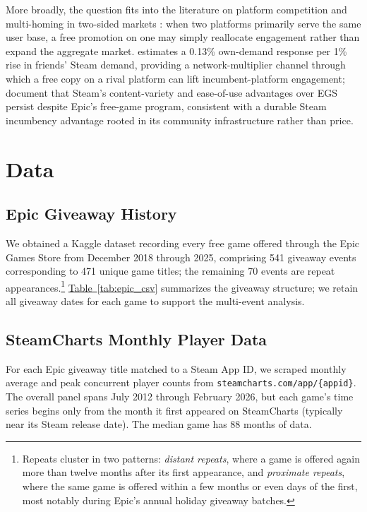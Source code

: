 \documentclass[11pt]{article}
\newcommand{\tabref}[1]{\hyperref[#1]{Table~\ref*{#1}}}
\begin{document}
More broadly, the question fits
into the literature on platform competition and multi-homing in two-sided markets
\citep{rochet2003}: when two platforms primarily serve the same user base, a free
promotion on one may simply reallocate engagement rather than expand the aggregate
market. \citet{tudon2022} estimates a 0.13\% own-demand response per 1\% rise in
friends' Steam demand, providing a network-multiplier channel through which a free
copy on a rival platform can lift incumbent-platform engagement; \citet{nabil2025}
document that Steam's content-variety and ease-of-use advantages over EGS persist
despite Epic's free-game program, consistent with a durable Steam incumbency
advantage rooted in its community infrastructure rather than price.

\section{Data}
\label{sec:data}

\subsection{Epic Giveaway History}

We obtained a Kaggle dataset \citep{dongre2025} recording every free game offered through
the Epic Games Store from December 2018 through 2025, comprising 541 giveaway events
corresponding to 471 unique game titles; the remaining 70 events are repeat
appearances.\footnote{Repeats cluster in two patterns: \textit{distant repeats},
where a game is offered again more than twelve months after its first
appearance, and \textit{proximate repeats}, where the same game is offered
within a few months or even days of the first, most notably during Epic's
annual holiday giveaway batches.} \tabref{tab:epic_csv} summarizes the giveaway
structure; we retain all giveaway dates for each game to support the
multi-event analysis.

\subsection{SteamCharts Monthly Player Data}

For each Epic giveaway title matched to a Steam App ID, we scraped monthly
average and peak concurrent player counts from
\texttt{steamcharts.com/app/\{appid\}}. The overall
panel spans July 2012 through February 2026, but each game's time series begins
only from the month it first appeared on SteamCharts (typically near its Steam
release date). The median game has 88 months of data.
\end{document}
